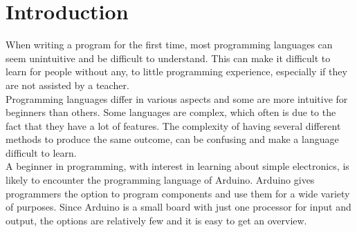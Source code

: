 \section{Introduction}
When writing a program for the first time, most programming languages can seem unintuitive and be difficult to understand. This can make it difficult to learn for people without any, to little programming experience, especially if they are not assisted by a teacher.\\
Programming languages differ in various aspects and some are more intuitive for beginners than others. Some languages are complex, which often is due to the fact that they have a lot of features. The complexity of having several different methods to produce the same outcome, can be confusing and make a language difficult to learn. \\
A beginner in programming, with interest in learning about simple electronics, is likely to encounter the programming language of Arduino. Arduino gives programmers the option to program components and use them for a wide variety of purposes. Since Arduino is a small board with just one processor for input and output, the options are relatively few and it is easy to get an overview. \\